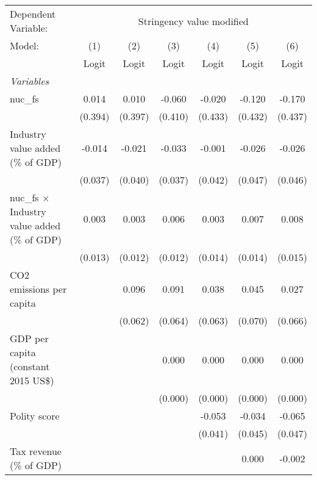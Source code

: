 
\begingroup
\centering
\begin{tabular}{lcccccc}
   \toprule
   Dependent Variable: & \multicolumn{6}{c}{Stringency value modified}\\
   Model:                                               & (1)     & (2)     & (3)     & (4)     & (5)     & (6)\\  
                                                        &  Logit  & Logit   & Logit   & Logit   & Logit   & Logit\\  
   \midrule
   \emph{Variables}\\
   nuc\_fs                                              & 0.014   & 0.010   & -0.060  & -0.020  & -0.120  & -0.170\\   
                                                        & (0.394) & (0.397) & (0.410) & (0.433) & (0.432) & (0.437)\\   
   Industry value added (\% of GDP)                     & -0.014  & -0.021  & -0.033  & -0.001  & -0.026  & -0.026\\   
                                                        & (0.037) & (0.040) & (0.037) & (0.042) & (0.047) & (0.046)\\   
   nuc\_fs $\times$ Industry value added (\% of GDP)    & 0.003   & 0.003   & 0.006   & 0.003   & 0.007   & 0.008\\   
                                                        & (0.013) & (0.012) & (0.012) & (0.014) & (0.014) & (0.015)\\   
   CO2 emissions per capita                             &         & 0.096   & 0.091   & 0.038   & 0.045   & 0.027\\   
                                                        &         & (0.062) & (0.064) & (0.063) & (0.070) & (0.066)\\   
   GDP per capita (constant 2015 US\$)                  &         &         & 0.000   & 0.000   & 0.000   & 0.000\\   
                                                        &         &         & (0.000) & (0.000) & (0.000) & (0.000)\\   
   Polity score                                         &         &         &         & -0.053  & -0.034  & -0.065\\   
                                                        &         &         &         & (0.041) & (0.045) & (0.047)\\   
   Tax revenue (\% of GDP)                              &         &         &         &         & 0.000   & -0.002\\   

\end{tabular}
